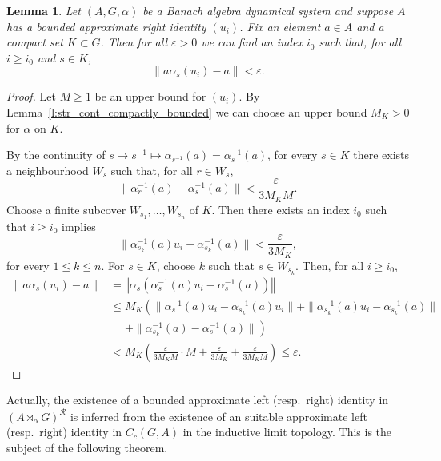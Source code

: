 \documentclass{amsart}
\theoremstyle{plain}
\newtheorem{lemma}[theorem]{Lemma}
\theoremstyle{definition}
\numberwithin{equation}{section}
\begin{document}
\begin{lemma}\label{l:approximation_on_compacta_involving_alpha_and_approximate_right_identity}
  Let ${(A,G,\alpha)}$ be a Banach algebra dynamical system and suppose $A$ has a bounded approximate right identity $(u_i)$. Fix an element $a \in A$ and a compact set $K \subset G$. Then for all ${\varepsilon} > 0$ we can find an index $i_0$ such that, for all $i \geq i_0$ and $s \in K$,
\[ \|a \alpha_s(u_i) - a\| < {\varepsilon}. \]
\end{lemma}
\begin{proof}
Let $M \geq 1$ be an upper bound for $(u_i)$. By Lemma~\ref{l:str_cont_compactly_bounded} we can choose an upper bound $M_K>0$ for $\alpha$ on $K$.

By the continuity of $s \mapsto s^{-1} \mapsto \alpha_{s^{-1}}(a) = \alpha_s^{-1}(a)$, for every $s \in K$ there exists a neighbourhood $W_s$ such that, for all $r \in W_s$,
 \[ \|\alpha_r^{-1}(a) - \alpha_s^{-1}(a)\| < \frac{\varepsilon}{3M_K M}. \]
Choose a finite subcover $W_{s_1}, \ldots, W_{s_n}$ of $K$. Then there exists an index $i_0$ such that $i\geq i_0$ implies
\[ \| \alpha_{s_k}^{-1}(a)u_i - \alpha_{s_k}^{-1}(a) \| < \frac{\varepsilon}{3M_K}, \]
for every $1\leq k \leq n$.
For $s \in K$, choose $k$ such that $s \in W_{s_k}$. Then, for all $i \geq i_0$,
\begin{align*}
 \| a\alpha_s(u_i) - a\| &= {\left\Vert {\alpha_s(\alpha_s^{-1}(a) u_i - \alpha_s^{-1}(a))} \right\Vert} \\
&\leq M_K \left( \|\alpha_s^{-1}(a)u_i - \alpha_{s_k}^{-1}(a)u_i\| + \| \alpha_{s_k}^{-1}(a)u_i - \alpha_{s_k}^{-1}(a) \|  \right. \\
&\phantom{=} \left. + \| \alpha_{s_k}^{-1}(a) - \alpha_s^{-1}(a) \| \right) \\
&< M_K \left( \frac{\varepsilon}{3M_K M}\cdot M + \frac{\varepsilon}{3M_K} + \frac{\varepsilon}{3M_K M} \right) \leq {\varepsilon}.
\end{align*}
\end{proof}

Actually, the existence of a bounded approximate left (resp.\ right) identity in ${(A {\rtimes}_\alpha G)^\mathcal{R}}$ is inferred from the existence of an suitable approximate left (resp.\ right) identity in $C_c(G,A)$ in the inductive limit topology. This is the subject of the following theorem.
\end{document}
